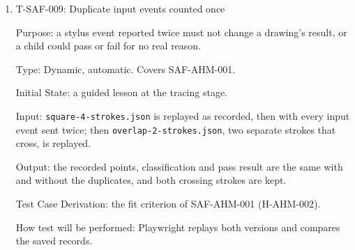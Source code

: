 \documentclass[12pt, titlepage]{article}
\newcommand{\testitem}[1]{\item #1\par\nopagebreak}
\begin{document}
\begin{enumerate}
Input: (a) no value is set; (b) each value is set to its minimum, its
maximum, one below the minimum and one above the maximum; (c)
\texttt{ATTEMPT\_LIMIT} is set equal to \texttt{DIFFICULTY\_STREAK}, and
\texttt{ATTEMPT\_LIMIT\_MAX} is set one below \texttt{ATTEMPT\_LIMIT},
\texttt{ATTEMPT\_IDLE} is set equal to \texttt{LESSON\_IDLE\_PROMPT}, and
\texttt{LESSON\_IDLE\_END} is set equal to \texttt{LESSON\_IDLE\_PROMPT}; (d) a
change is tried without completing the adult check.

Output: (a) each value is the middle of its range; (b) in-range values are
saved and out-of-range values are refused; (c) all four settings are refused;
(d) nothing changes. The values in use are shown with the child's records.

Example: the team-set range for \texttt{ATTEMPT\_LIMIT} is 6 to 10, so an unset
value is 8, values 6 and 10 are saved, and 5 and 11 are refused. With
\texttt{DIFFICULTY\_STREAK} = 5, an \texttt{ATTEMPT\_LIMIT} of 5 is refused: it
is below the range, and the lesson would also end before the adult received the
go-back suggestion.

Test Case Derivation: the fit criterion of SAF-RAY-008 (H-RAY-007), using
boundary values on each side of each range.

How test will be performed: a Vitest test checks the validation function
with every case, and Playwright repeats cases (b) to (d) through the
settings screen and through direct server requests.

\testitem{T-SAF-009: Duplicate input events counted once}

Purpose: a stylus event reported twice must not change a drawing's result,
or a child could pass or fail for no real reason.

Type: Dynamic, automatic. Covers SAF-AHM-001.

Initial State: a guided lesson at the tracing stage.

Input: \texttt{square-\allowbreak{}4-\allowbreak{}strokes.json} is replayed
as recorded, then with every input event sent twice; then
\texttt{overlap-\allowbreak{}2-\allowbreak{}strokes.json}, two separate
strokes that cross, is replayed.

Output: the recorded points, classification and pass result are the same
with and without the duplicates, and both crossing strokes are kept.

Test Case Derivation: the fit criterion of SAF-AHM-001 (H-AHM-002).

How test will be performed: Playwright replays both versions and compares
the saved records.


\end{enumerate}
\end{document}
